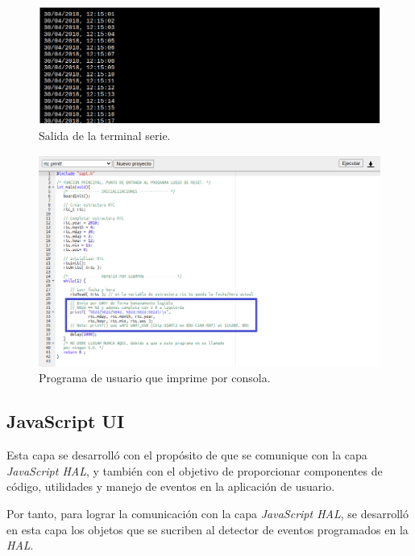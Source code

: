 \begin{figure}[ht]
	\centering
	\includegraphics[scale=.59]{./Figures/Terminal2.png}
	\caption{Salida de la terminal serie.}
	\label{fig:Terminal2}
\end{figure}



\begin{figure}[ht]
	\centering
	\includegraphics[scale=.42]{./Figures/Terminal1.png}
	\caption{Programa de usuario que imprime por consola.}
	\label{fig:Terminal1}
\end{figure}
 



 
 

\subsection{JavaScript UI}

Esta capa se desarrolló con el propósito de que se comunique con la capa \textit{JavaScript HAL}, y también con el objetivo de proporcionar componentes de código, utilidades y manejo de eventos en la aplicación de usuario.

Por tanto, para lograr la comunicación con la capa \textit{JavaScript HAL}, se desarrolló en esta capa los objetos que se sucriben al detector de eventos programados en la \textit{HAL}.

